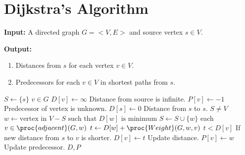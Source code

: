 \section{Dijkstra's Algorithm}

\noindent
\textbf{Input:} A directed graph $G = <V, E>$ and source vertex $s \in V$.

\noindent
\textbf{Output:}
\begin{enumerate}
  \item Distances from $s$ for each vertex $v \in V$.
  \item Predecessors for each $v \in V$ in shortest paths from $s$.
\end{enumerate}

\begin{codebox}
  \li $S \gets \{s\}$
  \li \For $v \in G$
  \li \Then $D[v] \gets \infty$ \>\>\>\Comment Distance from source is infinite.
  \li       $P[v] \gets -1$ \>\>\>\Comment Predecessor of vertex is unknown.
      \End
  \li $D[s] \gets 0$  \>\>\>\>\Comment Distance from $s$ to $s$.
  \li \While $S \ne V$
  \li \Then $w \gets \text{vertex in } V - S \text{ such that } D[w] \text{ is minimum}$
  \li       $S \gets S \cup \{w\}$
  \li       \For each $v \in \proc{adjacent}(G, w)$
  \li       \Then $t \gets D[w] + \proc{Weight}(G,w,v)$
  \li             \If $t < D[v]$ \>\>\>\>\Comment If new distance from $s$ to $v$ is shorter.
  \li             \Then $D[v] \gets t$ \>\>\>\Comment Update distance.
  \li                    $P[v] \gets w$ \>\>\>\Comment Update predecessor.
                  \End
            \End
      \End
  \li \Return $D,P$
\end{codebox}
